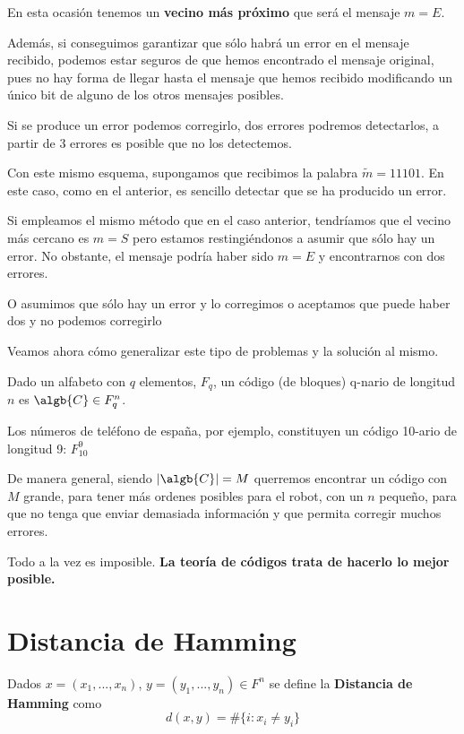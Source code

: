 \begin{example}
En esta ocasión tenemos un \textbf{vecino más próximo} que será el mensaje $m=E$.

Además, si conseguimos garantizar que sólo habrá un error en el mensaje recibido, podemos estar seguros de que hemos encontrado el mensaje original, pues no hay forma de llegar hasta el mensaje que hemos recibido modificando un único bit de alguno de los otros mensajes posibles.

\obs Si se produce un error podemos corregirlo, dos errores podremos detectarlos, a partir de 3 errores es posible que no los detectemos.

Con este mismo esquema, supongamos que recibimos la palabra $\tilde{m} = 11101$. En este caso, como en el anterior, es sencillo detectar que se ha producido un error.

Si empleamos el mismo método que en el caso anterior, tendríamos que el vecino más cercano es $m=S$ pero estamos restingiéndonos a asumir que sólo hay un error. No obstante, el mensaje podría haber sido $m=E$ y encontrarnos con dos errores.

\obs O asumimos que sólo hay un error y lo corregimos o aceptamos que puede haber dos y no podemos corregirlo

\end{example}

Veamos ahora cómo generalizar este tipo de problemas y la solución al mismo.

\begin{defn}
Dado un alfabeto con $q$ elementos, $F_q$, un código (de bloques) q-nario de longitud $n$ es $\algb{C}\in F_q^n$.

Los números de teléfono de españa, por ejemplo, constituyen un código 10-ario de longitud 9: $F_{10}^9$
\end{defn}

De manera general, siendo $|\algb{C}| = M$ querremos encontrar un código con $M$ grande, para tener más ordenes posibles para el robot, con un $n$ pequeño, para que no tenga que enviar demasiada información y que permita corregir muchos errores.

\obs Todo a la vez es imposible. \textbf{La teoría de códigos trata de hacerlo lo mejor posible.}

\section{Distancia de Hamming}
\begin{defn}
Dados $x=(x_1,...,x_n)$, $y=(y_1,...,y_n) \in F^n$ se define la \textbf{Distancia de Hamming} como
\[d(x,y)=\#\{i: x_i \neq y_i\}\]
\end{defn}

